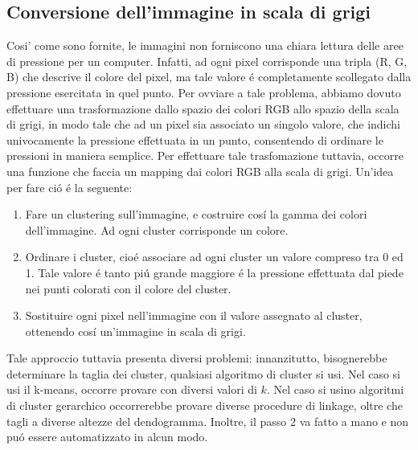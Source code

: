 \documentclass[11pt,a4paper]{article}
\begin{document}


\subsection{Conversione dell'immagine in scala di grigi}
Cosi' come sono fornite, le immagini non forniscono una chiara lettura delle aree di pressione per un computer. Infatti, ad ogni pixel corrisponde una tripla (R, G, B) che descrive il colore del pixel, ma tale valore \'e completamente scollegato dalla pressione esercitata in quel punto. Per ovviare a tale problema, abbiamo dovuto effettuare una trasformazione dallo spazio dei colori RGB allo spazio della scala di grigi, in modo tale che ad un pixel sia associato un singolo valore, che indichi univocamente la pressione effettuata in un punto, consentendo di ordinare le pressioni in maniera semplice. Per effettuare tale trasfomazione tuttavia, occorre una funzione che faccia un mapping dai colori RGB alla scala di grigi. Un'idea per fare ci\'o \'e la seguente:
\begin{enumerate}
	\item Fare un clustering sull'immagine, e costruire cos\'i la gamma dei colori dell'immagine. Ad ogni cluster corrisponde un colore.
	\item Ordinare i cluster, cio\'e associare ad ogni cluster un valore compreso tra 0 ed 1. Tale valore \'e tanto pi\'u grande maggiore \'e la pressione effettuata dal piede nei punti colorati con il colore del cluster.
	\item Sostituire ogni pixel nell'immagine con il valore assegnato al cluster, ottenendo cos\'i un'immagine in scala di grigi.
\end{enumerate}
Tale approccio tuttavia presenta diversi problemi: innanzitutto, bisognerebbe determinare la taglia dei cluster, qualsiasi algoritmo di cluster si usi. Nel caso si usi il k-means, occorre provare con diversi valori di $k$. Nel caso si usino algoritmi di cluster gerarchico occorrerebbe provare diverse procedure di linkage, oltre che tagli a diverse altezze del dendogramma. Inoltre, il passo $2$ va fatto a mano e non pu\'o essere automatizzato in alcun modo.
\end{document}
